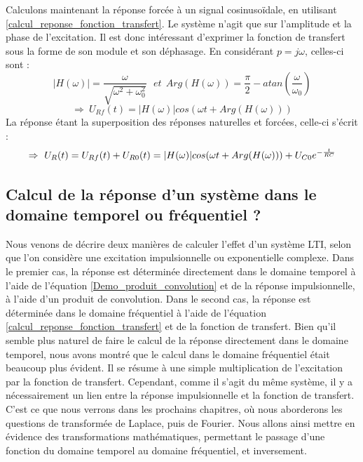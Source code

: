\begin{remark}{}
	Calculons maintenant la réponse forcée à un signal
        cosinusoïdale, en utilisant
        \ref{calcul_reponse_fonction_transfert}. Le système n'agit que
        sur l'amplitude et la phase de l'excitation. Il est donc
        intéressant d'exprimer la fonction de transfert sous la forme
        de son module et son déphasage. En considérant $p=j\omega$,
        celles-ci sont :
	\begin{equation*}
          |H(\omega)|=\frac{\omega}{\sqrt{\omega^{2}+\omega_{0}^{2}}}~~~et~~Arg(H(\omega))=\frac{\pi}{2}-atan(\frac{\omega}{\omega_{0}})
	\end{equation*}
	\begin{equation*}
          \Rightarrow~U_{Rf}(t)=|H(\omega)|cos(\omega t+Arg(H(\omega)))
	\end{equation*}
	La réponse étant la superposition des réponses naturelles et
        forcées, celle-ci s'écrit :
	\begin{equation*}
          \Rightarrow~U_{R}(t)=U_{Rf}(t)+U_{R0}(t)=|H(\omega)|cos(\omega t+Arg(H(\omega)))+U_{C0}e^{-\frac{t}{RC}}
	\end{equation*}
	
	\vspace{1\baselineskip}

	\subsection{Calcul de la réponse d'un système dans le domaine
          temporel ou fréquentiel ?}
	
	Nous venons de décrire deux manières de calculer l'effet d'un
        système LTI, selon que l'on considère une excitation
        impulsionnelle ou exponentielle complexe. Dans le premier cas,
        la réponse est déterminée directement dans le domaine temporel
        à l'aide de l'équation \ref{Demo_produit_convolution} et de la
        réponse impulsionnelle, à l'aide d'un produit de
        convolution. Dans le second cas, la réponse est déterminée
        dans le domaine fréquentiel à l'aide de l'équation
        \ref{calcul_reponse_fonction_transfert} et de la fonction de
        transfert.  Bien qu'il semble plus naturel de faire le calcul
        de la réponse directement dans le domaine temporel, nous avons
        montré que le calcul dans le domaine fréquentiel était
        beaucoup plus évident. Il se résume à une simple
        multiplication de l'excitation par la fonction de transfert.
        Cependant, comme il s'agit du même système, il y a
        nécessairement un lien entre la réponse impulsionnelle et la
        fonction de transfert. C'est ce que nous verrons dans les
        prochains chapitres, où nous aborderons les questions de
        transformée de Laplace, puis de Fourier. Nous allons ainsi
        mettre en évidence des transformations mathématiques,
        permettant le passage d'une fonction du domaine temporel au
        domaine fréquentiel, et inversement.
	

\end{remark}
